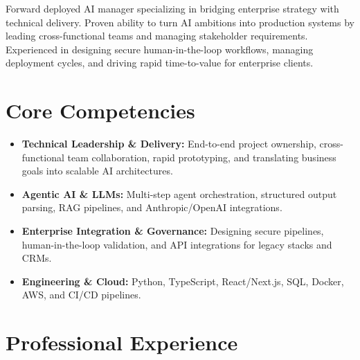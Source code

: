 \documentclass[11pt,a4paper,sans]{moderncv}
\begin{document}
\makecvtitle

Forward deployed AI manager specializing in bridging enterprise strategy with technical delivery. Proven ability to turn AI ambitions into production systems by leading cross-functional teams and managing stakeholder requirements. Experienced in designing secure human-in-the-loop workflows, managing deployment cycles, and driving rapid time-to-value for enterprise clients.

\section{Core Competencies}
\begin{itemize}
\item \textbf{Technical Leadership \& Delivery:} End-to-end project ownership, cross-functional team collaboration, rapid prototyping, and translating business goals into scalable AI architectures.
\item \textbf{Agentic AI \& LLMs:} Multi-step agent orchestration, structured output parsing, RAG pipelines, and Anthropic/OpenAI integrations.
\item \textbf{Enterprise Integration \& Governance:} Designing secure pipelines, human-in-the-loop validation, and API integrations for legacy stacks and CRMs.
\item \textbf{Engineering \& Cloud:} Python, TypeScript, React/Next.js, SQL, Docker, AWS, and CI/CD pipelines.
\end{itemize}

\section{Professional Experience}
\end{document}
